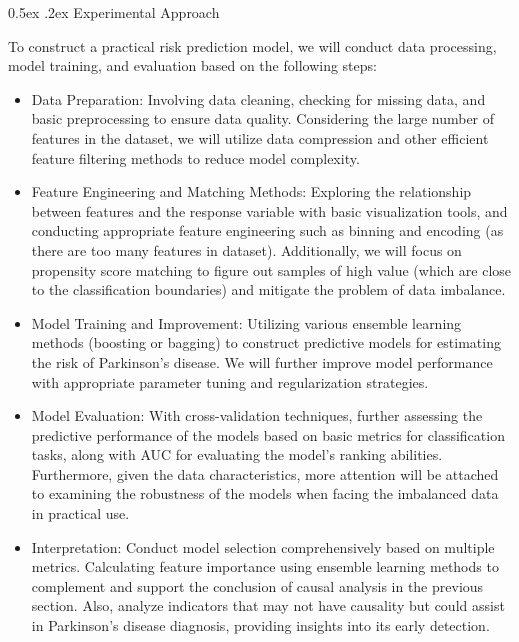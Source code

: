 \documentclass[12pt,]{article}
\makeatletter
\renewcommand\subsubsection{
  \@startsection{subsubsection}{3}{\z@}
    {-1.0ex\@plus -1ex \@minus -.2ex}%
    {0.5ex \@plus .2ex}%
    {\normalfont\normalsize\bf}} %
\makeatother
\begin{document}
\hypertarget{experimental-approach-1}{%
\subsubsection{Experimental Approach}\label{experimental-approach-1}}

To construct a practical risk prediction model, we will conduct data
processing, model training, and evaluation based on the following steps:

\begin{itemize}
\item
  Data Preparation: Involving data cleaning, checking for missing data,
  and basic preprocessing to ensure data quality. Considering the large
  number of features in the dataset, we will utilize data compression
  and other efficient feature filtering methods to reduce model
  complexity.
\item
  Feature Engineering and Matching Methods: Exploring the relationship
  between features and the response variable with basic visualization
  tools, and conducting appropriate feature engineering such as binning
  and encoding (as there are too many features in dataset).
  Additionally, we will focus on propensity score matching to figure out
  samples of high value (which are close to the classification
  boundaries) and mitigate the problem of data imbalance.
\item
  Model Training and Improvement: Utilizing various ensemble learning
  methods (boosting or bagging) to construct predictive models for
  estimating the risk of Parkinson's disease. We will further improve
  model performance with appropriate parameter tuning and regularization
  strategies.
\item
  Model Evaluation: With cross-validation techniques, further assessing
  the predictive performance of the models based on basic metrics for
  classification tasks, along with AUC for evaluating the model's
  ranking abilities. Furthermore, given the data characteristics, more
  attention will be attached to examining the robustness of the models
  when facing the imbalanced data in practical use.
\item
  Interpretation: Conduct model selection comprehensively based on
  multiple metrics. Calculating feature importance using ensemble
  learning methods to complement and support the conclusion of causal
  analysis in the previous section. Also, analyze indicators that may
  not have causality but could assist in Parkinson's disease diagnosis,
  providing insights into its early detection.
\end{itemize}
\end{document}
